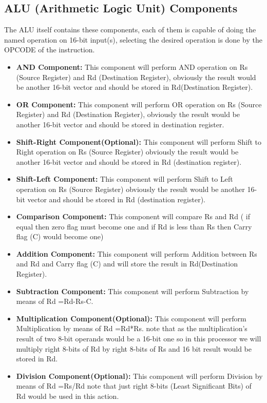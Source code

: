\documentclass{report}
\begin{document}
\subsection{ALU (Arithmetic Logic Unit) Components}
The ALU itself contains these components, each of them is capable of doing the named operation on 16-bit input(s), selecting the desired operation is done by the OPCODE of the instruction.
\begin{itemize}
	\item \textbf{AND Component:}
		This component will perform AND operation on Rs (Source Register) and Rd 			(Destination Register), obviously the result would be another 16-bit vector and 			should be stored in Rd(Destination Register).
	\item \textbf{OR Component:}
		This component will perform OR operation on Rs (Source Register) and Rd (Destination Register), obviously the result would be another 16-bit vector and 			should be stored in destination register.
	\item \textbf{Shift-Right Component(Optional):}
		This component will perform Shift to Right operation on Rs (Source Register) 			obviously the result would be another 16-bit vector and should be stored in 			Rd (destination register).
	\item \textbf{Shift-Left Component:}
		This component will perform Shift to Left operation on Rs (Source Register) 			obviously the result would be another 16-bit vector and should be stored in 			Rd (destination register).
	\item \textbf{Comparison Component:}
		This component will compare Rs and Rd ( if equal then zero flag must become 			one and if Rd is less than Rs then Carry flag (C) would become one)
	\item \textbf{Addition Component:}
		This component will perform Addition between Rs and Rd and Carry flag (C) and 			will store the result in Rd(Destination Register).
	\item \textbf{Subtraction Component:}
		This component will perform Subtraction by means of Rd =Rd-Rs-C.
	\item \textbf{Multiplication Component(Optional):}
		This component will perform Multiplication by means of Rd =Rd*Rs. note that as the multiplication's result of two 8-bit operands would be a 16-bit one so in this processor we will multiply right 8-bits of Rd by right 8-bits of Rs and 16 bit result 			would be stored in Rd.
	\item \textbf{Division Component(Optional):}
		This component will perform Division by means of Rd =Rs/Rd note that just right 		8-bits (Least Significant Bits) of Rd would be used in this action.

\end{itemize}
\end{document}
